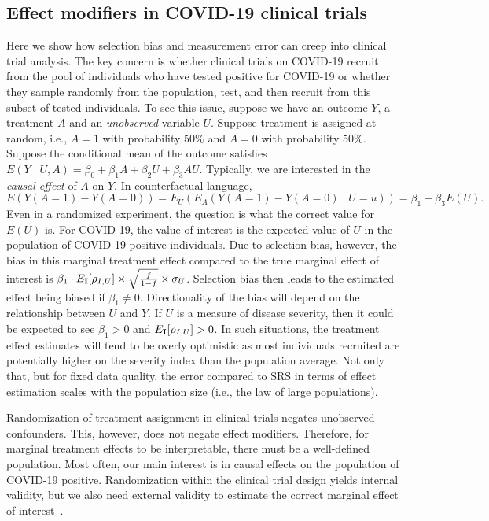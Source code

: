 \documentclass[12pt]{article}
\def\I{{\bf I}}
\begin{document}
\subsection*{Effect modifiers in COVID-19 clinical trials}

Here we show how selection bias and measurement error can creep into clinical trial analysis. The key concern is whether clinical trials on COVID-19 recruit from the pool of individuals who have tested positive for COVID-19 or whether they sample randomly from the population, test, and then recruit from this subset of tested individuals.  To see this issue, suppose we have an outcome $Y$, a treatment $A$ and an \emph{unobserved} variable $U$.  Suppose treatment is assigned at random, i.e., $A =1$ with probability $50\%$ and $A=0$ with probability $50\%$.  Suppose the conditional mean of the outcome satisfies  $E(Y \mid U, A ) = \beta_0 + \beta_1 A + \beta_2 U + \beta_3 A U$.  Typically, we are interested in the \emph{causal effect} of $A$ on $Y$.  In counterfactual language,
$$
E( Y(A=1) - Y(A=0) ) = E_U ( E_A ( Y(A=1) - Y(A=0) \mid U=u ))
= \beta_1 + \beta_3 E(U).
$$
Even in a randomized experiment, the question is what the correct value for $E(U)$ is. For COVID-19, the value of interest is the expected value of $U$ in the population of COVID-19 positive individuals.  Due to selection bias, however, the bias in this marginal treatment effect compared to the true marginal effect of interest is $\beta_1 \cdot E_{\I} [ \rho_{I,U} ] \times \sqrt{ \frac{f}{1-f} } \times \sigma_U$.  Selection bias then leads to the estimated effect being biased if $\beta_1 \neq 0$.  Directionality of the bias will depend on the relationship between $U$ and $Y$.  If $U$ is a measure of disease severity, then it could be expected to see $\beta_1 > 0$ and $E_{\I} [ \rho_{I, U} ] >0$.  In such situations, the treatment effect estimates will tend to be overly optimistic as most individuals recruited are potentially higher on the severity index than the population average.  Not only that, but for fixed data quality, the error compared to SRS in terms of effect estimation scales with the population size (i.e., the law of large populations).

Randomization of treatment assignment in clinical trials negates unobserved confounders.  This, however, does not negate effect modifiers.  Therefore, for marginal treatment effects to be interpretable, there must be a well-defined population.  Most often, our main interest is in causal effects on the population of COVID-19 positive.  Randomization within the clinical trial design yields internal validity, but we also need external validity to estimate the correct marginal effect of interest~\cite{Keiding2016}.
\end{document}
